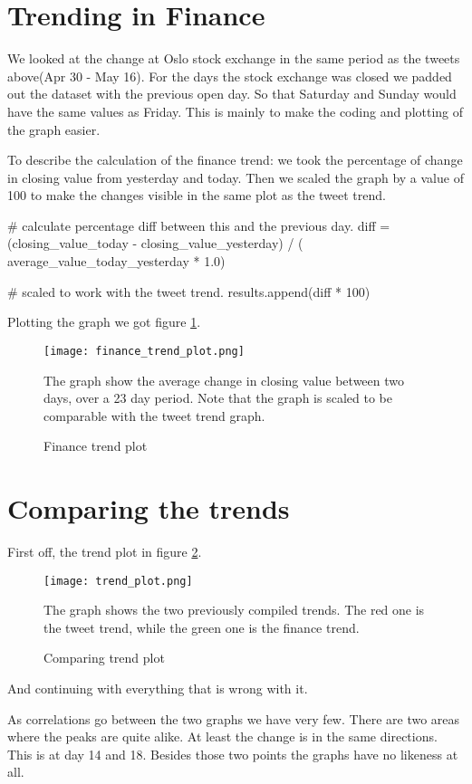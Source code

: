 \section{Trending in Finance}\label{trend:trends_in_finance}
We looked at the change at Oslo stock exchange in the same period as the tweets
above(Apr 30 - May 16). For the days the stock exchange was closed we padded out
the dataset with the previous open day. So that Saturday and Sunday would have
the same values as Friday. This is mainly to make the coding and plotting of
the graph easier. 

To describe the calculation of the finance trend: we took the percentage of
change in closing value from yesterday and today. Then we scaled the graph by a
value of 100 to make the changes visible in the same plot as the tweet trend.
\begin{python}
# calculate percentage diff between this and the previous day.
diff = (closing_value_today - closing_value_yesterday) / (
    average_value_today_yesterday * 1.0)

# scaled to work with the tweet trend.
results.append(diff * 100)
\end{python}

Plotting the graph we got figure \ref{fig:trend_finance_plot}.
\begin{figure}[htb]
    \centering
    \texttt{[image: finance\_trend\_plot.png]}
    \label{fig:trend_finance_plot}
    \caption{Finance trend plot}
The graph show the average change in closing value between two days, over a 23 day period. Note that the graph is scaled to be comparable with the tweet trend graph. 
\end{figure}
%

\section{Comparing the trends}\label{trend:compared}
First off, the trend plot in figure \ref{fig:trend_plot}. 
\begin{figure}[htb]
    \centering
    \texttt{[image: trend\_plot.png]}
    \label{fig:trend_plot}
    \caption{Comparing trend plot}
The graph shows the two previously compiled trends. The red one is the tweet
trend, while the green one is the finance trend.  
\end{figure}

And continuing with everything that is wrong with it. 

As correlations go between the two graphs we have very few. There are two areas
where the peaks are quite alike. At least the change is in the same directions.
This is at day 14 and 18. Besides those two points the graphs have no likeness
at all.  

